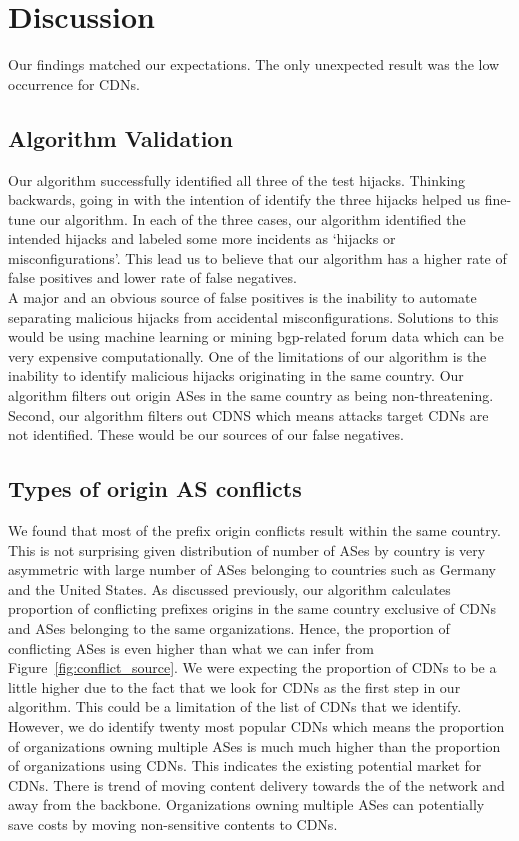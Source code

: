 \section{Discussion}\label{sec:discussion}
Our findings matched our expectations. The only unexpected result was the low occurrence for CDNs.
\subsection{Algorithm Validation}
Our algorithm successfully identified all three of the test hijacks. Thinking backwards, going in with the intention of identify the three hijacks helped us fine-tune our algorithm. In each of the three cases, our algorithm identified the intended hijacks and labeled some more incidents as `hijacks or misconfigurations'. This lead us to believe that our algorithm has a higher rate of false positives and lower rate of false negatives.\\
A major and an obvious source of false positives is the inability to automate separating malicious hijacks from accidental misconfigurations. Solutions to this would be using machine learning or mining bgp-related forum data which can be very expensive computationally. One of the limitations of our algorithm is the inability to identify malicious hijacks originating in the same country. Our algorithm filters out origin ASes in the same country as being non-threatening. Second, our algorithm filters out CDNS which means attacks target CDNs are not identified. These would be our sources of our false negatives. 
\subsection{Types of origin AS conflicts}
We found that most of the prefix origin conflicts result within the same country. This is not surprising given distribution of number of ASes by country is very asymmetric with large number of ASes belonging to countries such as Germany and the United States. As discussed previously, our algorithm calculates proportion of conflicting prefixes origins in the same country exclusive of CDNs and ASes belonging to the same organizations. Hence, the proportion of conflicting ASes is even higher than what we can infer from Figure~\ref{fig:conflict_source}. 
We were expecting the proportion of CDNs to be a little higher due to the fact that we look for CDNs as the first step in our algorithm. This could be a limitation of the list of CDNs that we identify. However, we do identify twenty most popular CDNs which means the proportion of organizations owning multiple ASes is much much higher than the proportion of organizations using CDNs. This indicates the existing potential market for CDNs. There is trend of moving content delivery towards the of the network and away from the backbone. Organizations owning multiple ASes can potentially save costs by moving non-sensitive contents to CDNs.
